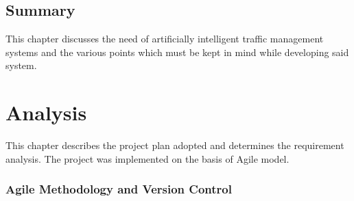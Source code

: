 \documentclass[openany,12pt]{report}
\begin{document}
	
	
	\section{Summary}
	\hspace*{0.5in}This chapter discusses the need of artificially intelligent traffic management systems and the various points which must be kept in mind while developing said system.\\
	
	
	\chapter{Analysis}

	
	\hspace*{0.5 in}This chapter describes the project plan adopted and determines the requirement analysis. The project was implemented on the basis of Agile model.\\
	\subsection{Agile Methodology and Version Control}
	
\end{document}
